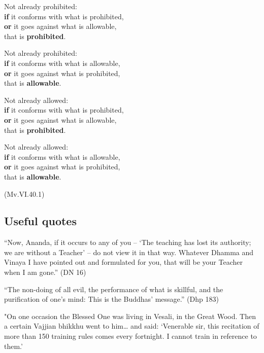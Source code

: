 \begin{multicols}{2}

Not already prohibited:\\
\textbf{if} it conforms with what is prohibited,\\
\textbf{or} it goes against what is allowable,\\
that is \textbf{prohibited}.

Not already prohibited:\\
\textbf{if} it conforms with what is allowable,\\
\textbf{or} it goes against what is prohibited,\\
that is \textbf{allowable}.

\columnbreak

Not already allowed:\\
\textbf{if} it conforms with what is prohibited,\\
\textbf{or} it goes against what is allowable,\\
that is \textbf{prohibited}.

Not already allowed:\\
\textbf{if} it conforms with what is allowable,\\
\textbf{or} it goes against what is prohibited,\\
that is \textbf{allowable}.

\end{multicols}

(Mv.VI.40.1)

\clearpage

\subsection{Useful quotes}

``Now, Ananda, if it occurs to any of you -- `The teaching has lost its
authority; we are without a Teacher' -- do not view it in that way.
Whatever Dhamma and Vinaya I have pointed out and formulated for you,
that will be your Teacher when I am gone.'' (DN 16)

``The non-doing of all evil, the performance of what is skillful, and
the purification of one's mind: This is the Buddhas' message.'' (Dhp
183)

"On one occasion the Blessed One was living in Vesali, in the Great
Wood. Then a certain Vajjian bhikkhu went to him\ldots{} and said:
`Venerable sir, this recitation of more than 150 training rules comes
every fortnight. I cannot train in reference to them.'

